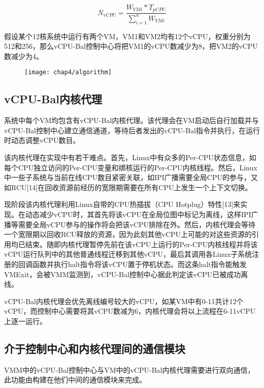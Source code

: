\begin{equation*}
N_{vCPU} = \frac{W_{VMi} * T_{pCPU}}{\sum_{i=1}^n W_{VMi}}
\end{equation*}

假设某个12核系统中运行有两个VM，VM1和VM2均有12个vCPU，权重分别为512和256，那么vCPU-Bal控制中心将把VM1的vCPU数减少为8，把VM2的vCPU数减少为4。

\begin{figure}[!htp]
  \centering
  \texttt{[image: chap4/algorithm]}
\end{figure}

\subsection{vCPU-Bal内核代理}

系统中每个VM均包含有vCPU-Bal内核代理。该代理会在VM启动后自行加载并与vCPU-Bal控制中心建立通信通道，等待后者发出的vCPU-Bal指令并执行，在运行时动态调整vCPU数目。

该内核代理在实现中有若干难点。首先，Linux中有众多的Per-CPU状态信息，如每个CPU独立访问的Per-CPU变量和绑核运行的Per-CPU内核线程。然后，Linux中一些子系统与当前在线CPU数目紧密关联，如IPI广播需要全局CPU的参与，又如RCU[14]在回收资源前经历的宽限期需要在所有CPU上发生一个上下文切换。

现阶段该内核代理利用Linux自带的CPU热插拔（CPU Hotplug）特性[13]来实现。在动态减少vCPU时，其首先将该vCPU在全局位图中标记为离线，这样IPI广播等需要全局vCPU参与的操作将会把该vCPU排除在外。然后，内核代理会等待一个宽限期以回收RCU释放的资源，因为此刻其他vCPU上可能的对这些资源的引用均已结束。随即内核代理暂停先前在该vCPU上运行的Per-CPU内核线程并将该vCPU运行队列中的其他普通线程迁移到其他vCPU，最后其调用各Linux子系统注册的回调函数并执行halt指令将该vCPU置于停机状态。而这条halt指令能触发VMExit，会被VMM监测到，vCPU-Bal控制中心据此判定该vCPU已被成功离线。

vCPU-Bal内核代理会优先离线编号较大的vCPU，如某VM中有0-11共计12个vCPU，而控制中心需要将其vCPU数减为6，内核代理会将以上流程在6-11vCPU上逐一运行。

\subsection{介于控制中心和内核代理间的通信模块}

VMM中的vCPU-Bal控制中心与VM中的vCPU-Bal内核代理需要进行双向通信，此功能由构建在他们中间的通信模块来完成。


